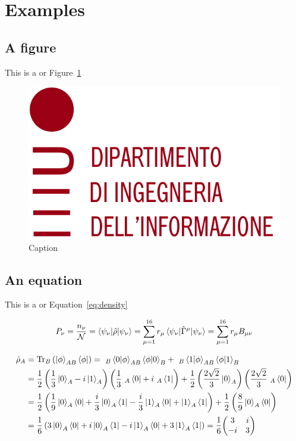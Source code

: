 \section*{Examples}
\subsection*{A figure}
This is a  or Figure~\ref{fig:name}
\par
\begin{figure}[h]
    \centering
    \includegraphics[width=.48\textwidth]{imgs/logo-dei.pdf}
    \caption{Caption}
    \label{fig:name}
\end{figure}
\lipsum[4-5]

\subsection*{An equation}
This is a  or Equation~\ref{eq:density}
\par
\begin{equation}
    P_\nu=\frac{n_\nu}{\mathcal{N}}=\braket{\psi_\nu\vert\hat{\rho}\vert\psi_\nu}=\sum_{\mu=1}^{16} r_\mu\braket{\psi_\nu\vert\hat{\Gamma}^\mu\vert\psi_\nu}=\sum_{\mu=1}^{16} r_\mu B_{\mu\nu}
    \label{eq:prob}
\end{equation}

\begin{strip}
    \begin{equation}
        \begin{split}
            \hat{\rho}_A &=\mathrm{Tr}_B\left(\ket{\phi}_{AB}\bra{\phi}\right)=~_B\braket{0\vert\phi}_{AB}\braket{\phi\vert0}_B+~_B\braket{1\vert\phi}_{AB}\braket{\phi\vert1}_B\\
            &=\frac{1}{2}\left(\frac{1}{3}\ket{0}_A-i\ket{1}_A\right)\left(\frac{1}{3}~_A\bra{0}+i~_A\bra{1}\right)+\frac{1}{2}\left(\frac{2\sqrt{2}}{3}\ket{0}_A\right)\left(\frac{2\sqrt{2}}{3}~_A\bra{0}\right)\\
            &=\frac{1}{2}\left(\frac{1}{9}\ket{0}_A\bra{0}+\frac{i}{3}\ket{0}_A\bra{1}-\frac{i}{3}\ket{1}_A\bra{0}+\ket{1}_A\bra{1}\right)+\frac{1}{2}\left(\frac{8}{9}\ket{0}_A\bra{0}\right)\\
            &=\frac{1}{6}\left(3\ket{0}_A\bra{0}+i\ket{0}_A\bra{1}-i\ket{1}_A\bra{0}+3\ket{1}_A\bra{1}\right)=\frac{1}{6}\text{$\begin{pmatrix}3 & i\\-i & 3\end{pmatrix}$}
        \end{split}
        \label{eq:density}
    \end{equation}
\end{strip}
\lipsum[4]

